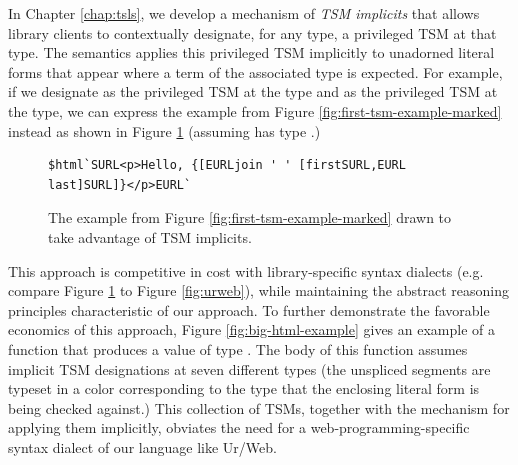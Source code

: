 In Chapter \ref{chap:tsls}, we develop a mechanism of \emph{TSM implicits} that allows library clients to contextually designate, for any type, a privileged TSM at that type. The semantics applies this privileged TSM implicitly to unadorned literal forms that appear where a term of the associated type is expected. For example, if we designate  as the privileged TSM at the  type and  as the privileged TSM at the  type, we can express the example from Figure \ref{fig:first-tsm-example-marked} instead as shown in Figure \ref{fig:first-tsm-example-implicit} (assuming  has type .) 
\begin{figure}[h]
\begin{lstlisting}[numbers=none]
$html`SURL<p>Hello, {[EURLjoin ' ' [firstSURL,EURL last]SURL]}</p>EURL`
\end{lstlisting}
\caption{The example from Figure \ref{fig:first-tsm-example-marked} drawn to take advantage of TSM implicits.}
\label{fig:first-tsm-example-implicit}
\end{figure}

\noindent This approach is competitive in cost with library-specific syntax dialects (e.g. compare Figure \ref{fig:first-tsm-example-implicit} to Figure \ref{fig:urweb}), while maintaining the abstract reasoning principles characteristic of our approach. To further demonstrate the favorable economics of this approach, Figure \ref{fig:big-html-example} gives an example of a function that produces a value of type . The body of this function assumes implicit TSM designations at seven different types (the unspliced segments are typeset in a color corresponding to the type that the enclosing literal form is being checked against.) This collection of TSMs, together with the mechanism for applying them implicitly, obviates the need for a web-programming-specific syntax dialect of our language like Ur/Web.

